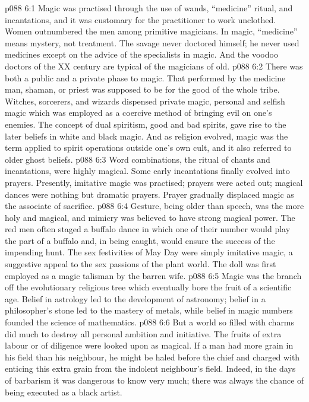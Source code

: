 \vs p088 6:1 Magic was practised through the use of wands, “medicine” ritual, and incantations, and it was customary for the practitioner to work unclothed. Women outnumbered the men among primitive magicians. In magic, “medicine” means mystery, not treatment. The savage never doctored himself; he never used medicines except on the advice of the specialists in magic. And the voodoo doctors of the XX century are typical of the magicians of old.
\vs p088 6:2 There was both a public and a private phase to magic. That performed by the medicine man, shaman, or priest was supposed to be for the good of the whole tribe. Witches, sorcerers, and wizards dispensed private magic, personal and selfish magic which was employed as a coercive method of bringing evil on one’s enemies. The concept of dual spiritism, good and bad spirits, gave rise to the later beliefs in white and black magic. And as religion evolved, magic was the term applied to spirit operations outside one’s own cult, and it also referred to older ghost beliefs.
\vs p088 6:3 Word combinations, the ritual of chants and incantations, were highly magical. Some early incantations finally evolved into prayers. Presently, imitative magic was practised; prayers were acted out; magical dances were nothing but dramatic prayers. Prayer gradually displaced magic as the associate of sacrifice.
\vs p088 6:4 Gesture, being older than speech, was the more holy and magical, and mimicry was believed to have strong magical power. The red men often staged a buffalo dance in which one of their number would play the part of a buffalo and, in being caught, would ensure the success of the impending hunt. The sex festivities of May Day were simply imitative magic, a suggestive appeal to the sex passions of the plant world. The doll was first employed as a magic talisman by the barren wife.
\vs p088 6:5 \pc Magic was the branch off the evolutionary religious tree which eventually bore the fruit of a scientific age. Belief in astrology led to the development of astronomy; belief in a philosopher’s stone led to the mastery of metals, while belief in magic numbers founded the science of mathematics.
\vs p088 6:6 \pc But a world so filled with charms did much to destroy all personal ambition and initiative. The fruits of extra labour or of diligence were looked upon as magical. If a man had more grain in his field than his neighbour, he might be haled before the chief and charged with enticing this extra grain from the indolent neighbour’s field. Indeed, in the days of barbarism it was dangerous to know very much; there was always the chance of being executed as a black artist.

